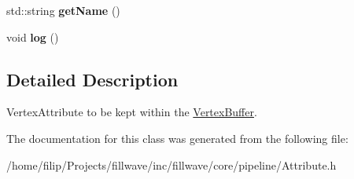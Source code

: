\begin{DoxyCompactItemize}
\item 
\hypertarget{classfillwave_1_1core_1_1Attribute_afd6c3547ae691b072587cc3e6f80e541}{}std\+::string {\bfseries get\+Name} ()\label{classfillwave_1_1core_1_1Attribute_afd6c3547ae691b072587cc3e6f80e541}

\item 
\hypertarget{classfillwave_1_1core_1_1Attribute_ad4ada17e0541a8844be58535b635a4a3}{}void {\bfseries log} ()\label{classfillwave_1_1core_1_1Attribute_ad4ada17e0541a8844be58535b635a4a3}

\end{DoxyCompactItemize}


\subsection{Detailed Description}
Vertex\+Attribute to be kept within the \hyperlink{classfillwave_1_1core_1_1VertexBuffer}{Vertex\+Buffer}. 

The documentation for this class was generated from the following file\+:\begin{DoxyCompactItemize}
\item 
/home/filip/\+Projects/fillwave/inc/fillwave/core/pipeline/Attribute.\+h\end{DoxyCompactItemize}
